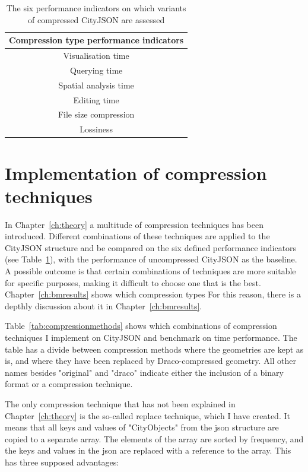 \begin{table}[h!]
\begin{center}
 \begin{tabular}{ |c |} 
 \hline
  Compression type performance indicators \\ [0.5ex] 
 \hline\hline
 Visualisation time \\
 \hline
 Querying time \\
 \hline
 Spatial analysis time \\
 \hline
 Editing time \\
 \hline
 File size compression \\ 
 \hline
 Lossiness \\
 \hline
\end{tabular}
\caption{The six performance indicators on which variants of compressed CityJSON are assessed}
\label{tab:methindicators}
\end{center}
\end{table}




\section{Implementation of compression techniques}
\label{sec:compressionimplementation}

In Chapter~\ref{ch:theory} a multitude of compression techniques has been introduced.
Different combinations of these techniques are applied to the CityJSON structure and be compared on the six defined performance indicators (see Table~\ref{tab:methindicators}), with the performance of uncompressed CityJSON as the baseline.
A possible outcome is that certain combinations of techniques are more suitable for specific purposes, making it difficult to choose one that is the best.
Chapter~\ref{ch:bmresults} shows which compression types 
For this reason, there is a depthly discussion about it in Chapter~\ref{ch:bmresults}.

Table~\ref{tab:compressionmethods} shows which combinations of compression techniques I implement on CityJSON and benchmark on time performance.
The table has a divide between compression methods where the geometries are kept as is, and where they have been replaced by Draco-compressed geometry.
All other names besides "original" and "draco" indicate either the inclusion of a binary format or a compression technique.

The only compression technique that has not been explained in Chapter~\ref{ch:theory} is the so-called replace technique, which I have created.
It means that all keys and values of "CityObjects" from the \ac{json} structure are copied to a separate array.
The elements of the array are sorted by frequency, and the keys and values in the \ac{json} are replaced with a reference to the array.
This has three supposed advantages: 

